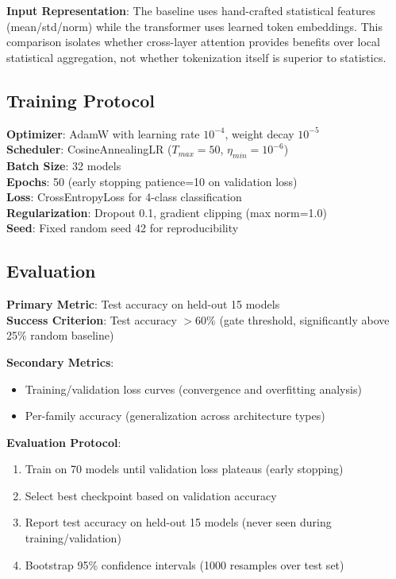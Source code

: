 \textbf{Input Representation}: The baseline uses hand-crafted statistical features (mean/std/norm) while the transformer uses learned token embeddings. This comparison isolates whether cross-layer attention provides benefits over local statistical aggregation, not whether tokenization itself is superior to statistics.

\subsection{Training Protocol}

\textbf{Optimizer}: AdamW with learning rate $10^{-4}$, weight decay $10^{-5}$\\
\textbf{Scheduler}: CosineAnnealingLR ($T_{max}=50$, $\eta_{min}=10^{-6}$)\\
\textbf{Batch Size}: 32 models\\
\textbf{Epochs}: 50 (early stopping patience=10 on validation loss)\\
\textbf{Loss}: CrossEntropyLoss for 4-class classification\\
\textbf{Regularization}: Dropout 0.1, gradient clipping (max norm=1.0)\\
\textbf{Seed}: Fixed random seed 42 for reproducibility

\subsection{Evaluation}

\textbf{Primary Metric}: Test accuracy on held-out 15 models\\
\textbf{Success Criterion}: Test accuracy $>$60\% (gate threshold, significantly above 25\% random baseline)

\textbf{Secondary Metrics}:
\begin{itemize}
\item Training/validation loss curves (convergence and overfitting analysis)
\item Per-family accuracy (generalization across architecture types)
\end{itemize}

\textbf{Evaluation Protocol}:
\begin{enumerate}
\item Train on 70 models until validation loss plateaus (early stopping)
\item Select best checkpoint based on validation accuracy
\item Report test accuracy on held-out 15 models (never seen during training/validation)
\item Bootstrap 95\% confidence intervals (1000 resamples over test set)
\end{enumerate}

